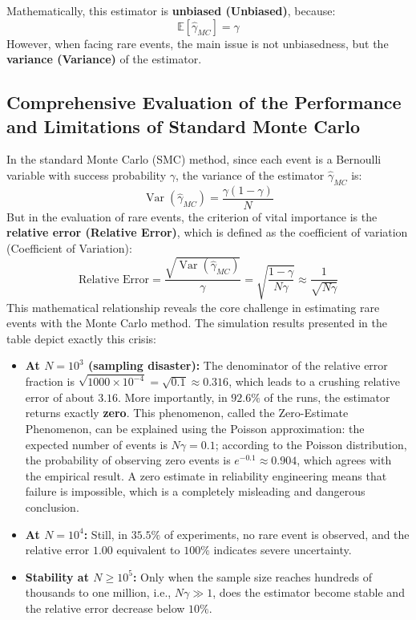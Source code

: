 \documentclass[12pt,a4paper]{article}
\begin{document}
	Mathematically, this estimator is \textbf{unbiased (Unbiased)}, because:
	\[
	\mathbb{E}[\hat{\gamma}_{MC}] = \gamma
	\]
	However, when facing rare events, the main issue is not unbiasedness, but the \textbf{variance (Variance)} of the estimator.
	
	\subsection{Comprehensive Evaluation of the Performance and Limitations of Standard Monte Carlo}
	
	In the standard Monte Carlo (SMC) method, since each event is a Bernoulli variable with success probability $\gamma$, the variance of the estimator $\hat{\gamma}_{MC}$ is:
	\[
	\operatorname{Var}(\hat{\gamma}_{MC}) = \frac{\gamma(1-\gamma)}{N}
	\]
	But in the evaluation of rare events, the criterion of vital importance is the \textbf{relative error (Relative Error)}, which is defined as the coefficient of variation (Coefficient of Variation):
	\[
	\text{Relative Error} =
	\frac{\sqrt{\operatorname{Var}(\hat{\gamma}_{MC})}}{\gamma} =
	\sqrt{\frac{1-\gamma}{N\gamma}} \approx \frac{1}{\sqrt{N\gamma}}
	\]
	This mathematical relationship reveals the core challenge in estimating rare events with the Monte Carlo method. The simulation results presented in the table depict exactly this crisis:
	
	\begin{itemize}
		\item \textbf{At $N = 10^3$ (sampling disaster):} The denominator of the relative error fraction is $\sqrt{1000 \times 10^{-4}} = \sqrt{0.1} \approx 0.316$, which leads to a crushing relative error of about $3.16$. More importantly, in \textbf{$92.6\%$} of the runs, the estimator returns exactly \textbf{zero}. This phenomenon, called the Zero-Estimate Phenomenon, can be explained using the Poisson approximation: the expected number of events is $N\gamma = 0.1$; according to the Poisson distribution, the probability of observing zero events is $e^{-0.1} \approx 0.904$, which agrees with the empirical result. A zero estimate in reliability engineering means that failure is impossible, which is a completely misleading and dangerous conclusion.
		\item \textbf{At $N = 10^4$:} Still, in $35.5\%$ of experiments, no rare event is observed, and the relative error $1.00$ equivalent to $100\%$ indicates severe uncertainty.
		\item \textbf{Stability at $N \ge 10^5$:} Only when the sample size reaches hundreds of thousands to one million, i.e., $N\gamma \gg 1$, does the estimator become stable and the relative error decrease below $10\%$.
	\end{itemize}
	
\end{document}
